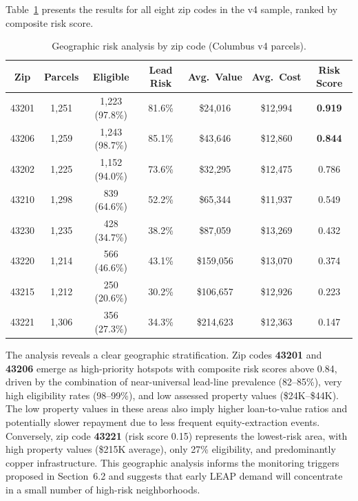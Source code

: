 \documentclass[11pt, letterpaper]{article}
\begin{document}
Table~\ref{tab:geographic} presents the results for all eight zip codes in the v4 sample, ranked by composite risk score.

\begin{table}[H]
  \centering
  \caption{Geographic risk analysis by zip code (Columbus v4 parcels).}
  \label{tab:geographic}
  \begin{tabular}{@{}ccccccc@{}}
    \toprule
    \textbf{Zip} & \textbf{Parcels} & \textbf{Eligible} & \textbf{Lead Risk} & \textbf{Avg.\ Value} & \textbf{Avg.\ Cost} & \textbf{Risk Score} \\
    \midrule
    43201 & 1{,}251 & 1{,}223 (97.8\%) & 81.6\% & \$24{,}016 & \$12{,}994 & \textbf{0.919} \\
    43206 & 1{,}259 & 1{,}243 (98.7\%) & 85.1\% & \$43{,}646 & \$12{,}860 & \textbf{0.844} \\
    43202 & 1{,}225 & 1{,}152 (94.0\%) & 73.6\% & \$32{,}295 & \$12{,}475 & 0.786 \\
    43210 & 1{,}298 & 839 (64.6\%) & 52.2\% & \$65{,}344 & \$11{,}937 & 0.549 \\
    43230 & 1{,}235 & 428 (34.7\%) & 38.2\% & \$87{,}059 & \$13{,}269 & 0.432 \\
    43220 & 1{,}214 & 566 (46.6\%) & 43.1\% & \$159{,}056 & \$13{,}070 & 0.374 \\
    43215 & 1{,}212 & 250 (20.6\%) & 30.2\% & \$106{,}657 & \$12{,}926 & 0.223 \\
    43221 & 1{,}306 & 356 (27.3\%) & 34.3\% & \$214{,}623 & \$12{,}363 & 0.147 \\
    \bottomrule
  \end{tabular}
\end{table}

The analysis reveals a clear geographic stratification. Zip codes \textbf{43201} and \textbf{43206} emerge as high-priority hotspots with composite risk scores above 0.84, driven by the combination of near-universal lead-line prevalence (82--85\%), very high eligibility rates (98--99\%), and low assessed property values (\$24K--\$44K). The low property values in these areas also imply higher loan-to-value ratios and potentially slower repayment due to less frequent equity-extraction events. Conversely, zip code \textbf{43221} (risk score 0.15) represents the lowest-risk area, with high property values (\$215K average), only 27\% eligibility, and predominantly copper infrastructure. This geographic analysis informs the monitoring triggers proposed in Section~6.2 and suggests that early LEAP demand will concentrate in a small number of high-risk neighborhoods.
\end{document}
